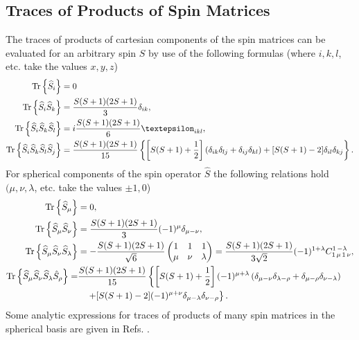 \subsection{Traces of Products of Spin Matrices}
The traces of products of cartesian components of the spin matrices can be evaluated for an arbitrary spin $S$ by use of the following formulas (where $i, k, l$, etc. take the values $x, y, z$)
\begin{align}
\Tr \left\{\widehat{S}_{i}\right\} & =0\  \notag\\
\Tr \left\{\widehat{S}_{i} \widehat{S}_{k}\right\} & =\frac{S(S+1)(2 S+1)}{3} \delta_{i k} , \notag\\
\Tr \left\{\widehat{S}_{i} \widehat{S}_{k} \widehat{S}_{l}\right\} & =i \frac{S(S+1)(2 S+1)}{6} \varepsilon_{i k l} , \label{eq:2:3:11}\\
\Tr \left\{\widehat{S}_{i} \widehat{S}_{k} \widehat{S}_{l} \widehat{S}_{j}\right\} & =\frac{S(S+1)(2 S+1)}{15}\left\{\left[S(S+1)+\frac{1}{2}\right]\left(\delta_{i k} \delta_{l j}+\delta_{i j} \delta_{k l}\right)+[S(S+1)-2] \delta_{i l} \delta_{k j}\right\} .\notag
\end{align}
For spherical components of the spin operator $\widehat{S}$ the following relations hold $(\mu, \nu, \lambda$, etc. take the values $\pm 1,0$)
\begin{align}
\operatorname{Tr} \left\{\widehat{S}_{\mu}\right\} & =0,  \notag\\
\operatorname{Tr} \left\{\widehat{S}_{\mu} \widehat{S}_{\nu}\right\} & =\frac{S(S+1)(2 S+1)}{3}(-1)^{\mu} \delta_{\mu-\nu},  \notag\\
\operatorname{Tr} \left\{\widehat{S}_{\mu} \widehat{S}_{\nu} \widehat{S}_{\lambda}\right\} & =-\frac{S(S+1)(2 S+1)}{\sqrt{6}}\begin{pmatrix}
1 & 1 & 1 \\
\mu & \nu & \lambda
\end{pmatrix}=\frac{S(S+1)(2 S+1)}{3 \sqrt{2}}(-1)^{1+\lambda} C_{1\,\mu\,1\,\nu}^{1\,-\lambda},  \label{eq:2:3:12}\\
\operatorname{Tr} \left\{\widehat{S}_{\mu} \widehat{S}_{\nu} \widehat{S}_{\lambda} \hat{S}_{\rho}\right\}= & \frac{S(S+1)(2 S+1)}{15}\left\{\left[S(S+1)+\frac{1}{2}\right](-1)^{\mu+\lambda}\left(\delta_{\mu-\nu} \delta_{\lambda-\rho}+\delta_{\mu-\rho} \delta_{\nu-\lambda}\right)\right.  \notag\\
& \left.\quad+[S(S+1)-2](-1)^{\mu+\nu} \delta_{\mu-\lambda} \delta_{\nu-\rho}\right\} . \notag
\end{align}
Some analytic expressions for traces of products of many spin matrices in the spherical basis are given in Refs. \cite{ref133, ref144, ref145}.

